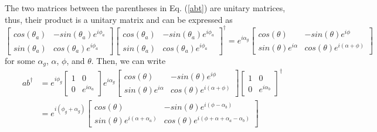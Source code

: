 The two matrices between the parentheses in Eq. (\ref{abt}) are unitary matrices, thus, their
product is a unitary matrix and can be expressed as
\begin{equation}
\begin{bmatrix}cos(\theta_a)&-sin(\theta_a)e^{i\phi_a}\\
  sin(\theta_a)&cos(\theta_a)e^{i\phi_a}\end{bmatrix}\begin{bmatrix}
  cos(\theta_a)&-sin(\theta_a)e^{i\phi_a}\\sin(\theta_a)
  &cos(\theta_a)e^{i\phi_a}\end{bmatrix}^\dagger = 
  e^{i\alpha_g}\begin{bmatrix}cos(\theta)&-sin(\theta)e^{i\phi}\\
  sin(\theta)e^{i\alpha}&cos(\theta)e^{i(\alpha + \phi)}\end{bmatrix}
\end{equation}
for some $\alpha_g$, $\alpha$, $\phi$, and $\theta$. Then, we can write
\begin{align}
ab^\dagger &= e^{i\phi_g}\begin{bmatrix}1&0\\0&e^{i\alpha_a}\end{bmatrix}
  e^{i\alpha_g}\begin{bmatrix}cos(\theta)&-sin(\theta)e^{i\phi}\\
  sin(\theta)e^{i\alpha}&cos(\theta)e^{i(\alpha + \phi)}\end{bmatrix}
  \begin{bmatrix}1&0\\0&e^{i\alpha_b}\end{bmatrix}^\dagger \nonumber \\
 &= e^{i(\phi_g + \alpha_g)}\begin{bmatrix}cos(\theta)&-sin(\theta)
  e^{i(\phi - \alpha_b)}\\sin(\theta)e^{i(\alpha + \alpha_a)}
  &cos(\theta)e^{i(\phi + \alpha + \alpha_a - \alpha_b)}\end{bmatrix}
\end{align}

